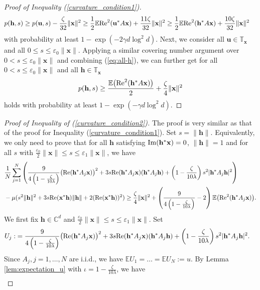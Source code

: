 \documentclass{article}
\renewcommand{\eqref}[1]{(\ref{#1})}
\newcommand{\C}{{\mathbb C}}
\newcommand{\E}{{\mathbb E}}
\newcommand{\re}{{\rm Re}}
\newcommand{\im}{{\rm Im}}
\newcommand{\vx}{{\mathbf x}}
\newcommand{\vu}{{\mathbf u}}
\newcommand{\vh}{{\mathbf h}}
\newcommand{\0}{{\mathbf 0}}
\numberwithin{equation}{section}
\begin{document}
\begin{proof}[Proof of Inequality \eqref{curvature_condition1}]
	\begin{align}\label{eq:all-h}
		p(\vh,s)
		&\ge p(\vu,s)-\frac{\zeta}{32}\|\vx\|^2\ge \frac12\E\re^2(\vu^*A\vx)+\frac{11\zeta}{32}\|\vx\|^2\ge \frac12\E\re^2(\vh^*A\vx)+\frac{10\zeta}{32}\|\vx\|^2
	\end{align}
	with probability at least $ 1-\exp(-2\gamma d\log^2d) $. 
	Next, we consider all $\vu\in\mathbb T_\vx$ and all $0\le s\le\varepsilon_0\|\vx\|$. Applying a similar covering number argument over $ 0< s\leq \varepsilon_0\|\vx\| $ and combining \eqref{eq:all-h}, we can further get for all $ 0< s\leq\varepsilon_0\|\vx\| $ and all $ \vh\in\mathbb T_\vx $  
	$$ 
	p(\vh,s)\geq  \frac{\E\big(\re^2(\vh^*A\vx)\big)}{2}+\frac{\zeta}{4} \|\vx\|^2
	$$ 
	holds with probability at least $ 1-\exp(-\gamma d\log^2d) $. 
\end{proof}
\begin{proof}[Proof of Inequality of \eqref{curvature_condition2}]
	The proof is very similar as that of the proof for Inequality \eqref{curvature_condition1}. Set $s=\|\vh\|$. Equivalently, we only need to prove that for all  $ \vh $ satisfying $\im(\vh^*\vx)=0 $, $ \|\vh\|=1 $ and for all $ s $ with $ \frac{\varepsilon_0}2\|\vx\|\le s\le\varepsilon_1\|\vx\| $, we have
	\begin{equation}\label{eq:curvature_condition1-1}
		\begin{split}
			&\frac{1}{N}\sum^N_{j=1}\left(\frac{9}{4\left(1-\frac{\zeta}{10\lambda}\right)}\big(\re(\vh^*A_j\vx)\big)^2
			+3s\re(\vh^*A_j\vx)(\vh^*A_j\vh)+\left(1-\frac{\zeta}{10\lambda}\right)s^2|\vh^*A_j\vh|^2\right)\\
			&-\mu(s^2\|\vh\|^2+3s\re(\vx^*\vh)\|\vh\|+2(\re(\vx^*\vh))^2)\ge\frac{\zeta}{4}\|\vx\|^2+\left(\frac{9}{4\left(1-\frac{\zeta}{10\lambda}\right)}-2\right) \E\big(\re^2(\vh^*A_j\vx)\big).
		\end{split}
	\end{equation}
	We first fix $\vh\in\C^d$ and  $\frac{\varepsilon_0}2\|\vx\|\le  s\le\varepsilon_1\|\vx\|$. Set 
	\begin{align*}
		U_j : &= \frac{9}{4\left(1-\frac{\zeta}{10\lambda}\right)}\big(\re(\vh^*A_j\vx)\big)^2
		+3s\re(\vh^*A_j\vx)(\vh^*A_j\vh)+\left(1-\frac{\zeta}{10\lambda}\right)s^2|\vh^*A_j\vh|^2.
	\end{align*}                                                                                
	Since $ A_j, j=1,\ldots,N $ are i.i.d., we have $\E U_1=\ldots=\E U_N:=u$.  By Lemma \ref{lem:expectation_u} with $\iota=1-\frac{\zeta}{10\lambda}$, we have 
	\begin{align*}

\end{align*}
\end{proof}
\end{document}
